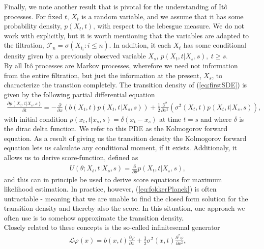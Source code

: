 Finally, we note another result that is pivotal for the understanding of Itô processes. For fixed $t$, $X_t$ is a random variable, and we assume that it has some probability density, $p(X_t, t)$, with respect to the lebesgue measure. We do not work with explicitly, but it is worth mentioning that the variables are adapted to the filtration, $\mathcal{F}_n = \sigma\left(X_{t_i}: i \leq n\right)$. In addition, it each $X_t$ has some conditional density given by a previously observed variable $X_s$, $p(X_t, t | X_s, s), \; t\geq s$.\\ 
By \cite[theorem 7.1.2]{Oksendal2003_yu} all Itô processes are Markov processes, wherefore we need not information from the entire filtration, but just the information at the present, $X_s$, to characterize the transtion completely. The transition density of (\ref{eq:firstSDE}) is given by the following partial differential equation
\begin{align}
    \frac{\partial p(X_t, t | X_s, s)}{\partial t} = -\frac{\partial}{\partial x}\left(b(X_t, t)p(X_t, t | X_s, s)\right) + \frac{1}{2}\frac{\partial^2}{\partial x^2}\left(\sigma^2(X_t, t)p(X_t, t | X_s, s)\right),\label{eq:fokkerPlanck} 
\end{align}
with initial condition $p(x_t, t|x_s, s) = \delta(x_t - x_s)$ at time $t = s$ and where $\delta$ is the dirac delta function. We refer to this PDE as the Kolmogorov forward equation. As a result of giving us the transition density the Kolmogorov forward equation lets us calculate any conditional moment, if it exists. Additionaly, it allows us to derive score-function, defined as
\begin{align}
    U(\theta; X_t, t | X_s, s) = \frac{\partial}{\partial\theta}p(X_t, t | X_s, s), \label{eq:transitionScore}
\end{align}
and this can in principle be used to derive score equations for maximum likelihood estimation. In practice, however, (\ref{eq:fokkerPlanck}) is often untractable - meaning that we are unable to find the closed form solution for the transition density and thereby also the score. In this situation, one approach we often use is to somehow approximate the transition density.\\
Closely related to these concepts is the so-called infinitesemal generator 
\begin{align}
    \mathcal{L}\varphi(x) = b(x, t) \frac{\partial\varphi}{\partial x} + \frac{1}{2}\sigma^2(x, t)\frac{\partial^2\varphi}{\partial x^2} \label{eq:infinitesemalGeneratorDefinition},
\end{align}
